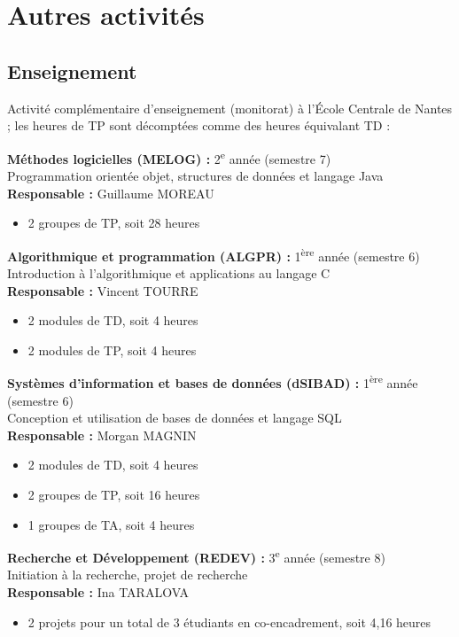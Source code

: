 \chapter{Autres activités}

\section{Enseignement}

Activité complémentaire d'enseignement (monitorat) à l'École Centrale de Nantes ; les heures de TP sont décomptées comme des heures équivalant TD :

\bigskip

\noindent
\textbf{Méthodes logicielles (MELOG) :} 2\textsuperscript{e} année (semestre 7)\\
Programmation orientée objet, structures de données et langage Java\\
\textbf{Responsable :} Guillaume MOREAU
\begin{itemize}
  \item 2 groupes de TP, soit 28 heures
\end{itemize}

\medskip\noindent
\textbf{Algorithmique et programmation (ALGPR) :} 1\textsuperscript{ère} année (semestre 6)\\
Introduction à l'algorithmique et applications au langage C\\
\textbf{Responsable :} Vincent TOURRE
\begin{itemize}
  \item 2 modules de TD, soit 4 heures
  \item 2 modules de TP, soit 4 heures
\end{itemize}

\medskip\noindent
\textbf{Systèmes d'information et bases de données (dSIBAD) :} 1\textsuperscript{ère} année (semestre 6)\\
Conception et utilisation de bases de données et langage SQL\\
\textbf{Responsable :} Morgan MAGNIN
\begin{itemize}
  \item 2 modules de TD, soit 4 heures
  \item 2 groupes de TP, soit 16 heures
  \item 1 groupes de TA, soit 4 heures
\end{itemize}

\medskip\noindent
\textbf{Recherche et Développement (REDEV) :} 3\textsuperscript{e} année (semestre 8)\\
Initiation à la recherche, projet de recherche\\
\textbf{Responsable :} Ina TARALOVA
\begin{itemize}
  \item 2 projets pour un total de 3 étudiants en co-encadrement, soit 4,16 heures
\end{itemize}

